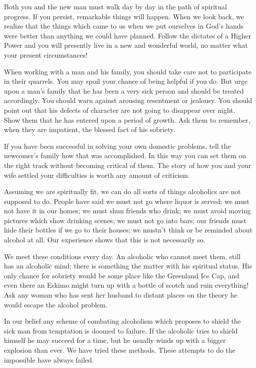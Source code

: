 \begin{biblechapter}
Both you and the new man must walk day by day in the path of spiritual progress.  If you persist, remarkable things will happen.  When we look back, we realize that the things which came to us when we put ourselves in God's hands were better than anything we could have planned.  Follow the dictates of a Higher Power and you will presently live in a new and wonderful world, no matter what your present  circumstances!

When working with a man and his family, you should take care not to participate in their quarrels.  You may spoil your chance of being helpful if you do.  But urge upon a man's family that he has been a very sick person and should be treated accordingly.  You should warn against arousing resentment or jealousy.  You should point out that his defects of character are not going to disappear over night.  Show them that he has entered upon a period of growth.  Ask them to remember, when they are impatient, the blessed fact of his sobriety.

If you have been successful in solving your own domestic problems, tell the newcomer's family how that was accomplished.  In this way you can set them on the right track without becoming critical of them.  The story of how you and your wife settled your difficulties is worth any amount of criticism.

Assuming we are spiritually fit, we can do all sorts of things alcoholics are not supposed to do.  People have said we must not go where liquor is served; we must not have it in our homes; we must shun friends who drink; we must avoid moving pictures which show drinking scenes; we must not go into bars; our friends must hide their bottles if we go to their houses; we mustn't think or be reminded about alcohol at all.  Our experience shows that this is not necessarily so.

We meet these conditions every day.  An alcoholic who cannot meet them, still has an alcoholic mind; there is something the matter with his spiritual status.  His only chance for sobriety would be some place like the Greenland Ice Cap, and even there an Eskimo might turn up with a bottle of scotch and ruin everything!  Ask any woman who has sent her husband to distant places on the theory he would escape the alcohol problem.

In our belief any scheme of combating alcoholism which proposes to shield the sick man from temptation is doomed to failure.  If the alcoholic tries to shield himself he may succeed for a time, but he usually winds up with a bigger explosion than ever.  We have tried these methods.  These attempts to do the impossible have always failed.


\end{biblechapter}
